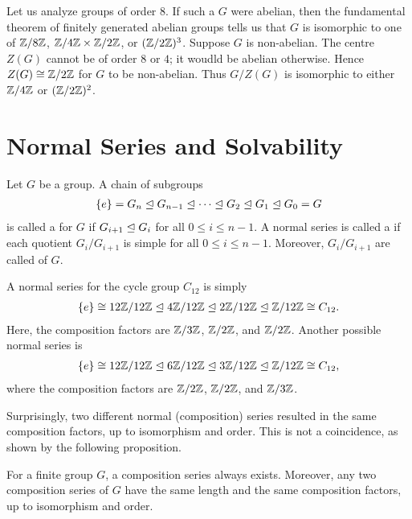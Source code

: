 \begin{example}
    Let us analyze groups of order $8$. If such a $G$ were abelian, then the fundamental theorem of finitely generated abelian groups tells us that $G$ is isomorphic to one of $\mathbb{Z}/8\mathbb{Z}$, $\mathbb{Z}/4\mathbb{Z} \times \mathbb{Z}/2\mathbb{Z}$, or $(\mathbb{Z}/2\mathbb{Z})^{3}$. Suppose $G$ is non-abelian. The centre $Z(G)$ cannot be of order $8$ or $4$; it woudld be abelian otherwise. Hence $Z(G) \cong \mathbb{Z}/2\mathbb{Z}$ for $G$ to be non-abelian. Thus $G/Z(G)$ is isomorphic to either $\mathbb{Z}/4\mathbb{Z}$ or $(\mathbb{Z}/2\mathbb{Z})^{2}$.
\end{example}

\section{Normal Series and Solvability}

\begin{definition}
    Let $G$ be a group. A chain of subgroups
    \begin{align}
        \{e\} = G_{n} \trianglelefteq G_{n-1} \trianglelefteq \cdots \trianglelefteq G_{2} \trianglelefteq G_{1} \trianglelefteq G_{0} = G
    \end{align}
    is called a  for $G$ if $G_{i+1} \trianglelefteq G_{i}$ for all $0 \leq i \leq n-1$. A normal series is called a  if each quotient $G_{i}/G_{i+1}$ is simple for all $0 \leq i \leq n-1$. Moreover, $G_{i}/G_{i+1}$ are called  of $G$.
\end{definition}

\begin{example}
    A normal series for the cycle group $C_{12}$ is simply
    \begin{align}
        \{e\} \cong 12\mathbb{Z}/12\mathbb{Z} \trianglelefteq 4\mathbb{Z}/12\mathbb{Z} \trianglelefteq 2\mathbb{Z}/12\mathbb{Z} \trianglelefteq \mathbb{Z}/12\mathbb{Z} \cong C_{12}.
    \end{align}
    Here, the composition factors are $\mathbb{Z}/3\mathbb{Z}$, $\mathbb{Z}/2\mathbb{Z}$, and $\mathbb{Z}/2\mathbb{Z}$. Another possible normal series is
    \begin{align}
        \{e\} \cong 12\mathbb{Z}/12\mathbb{Z} \trianglelefteq 6\mathbb{Z}/12\mathbb{Z} \trianglelefteq 3\mathbb{Z}/12\mathbb{Z} \trianglelefteq \mathbb{Z}/12\mathbb{Z} \cong C_{12},
    \end{align}
    where the composition factors are $\mathbb{Z}/2\mathbb{Z}$, $\mathbb{Z}/2\mathbb{Z}$, and $\mathbb{Z}/3\mathbb{Z}$.
\end{example}

Surprisingly, two different normal (composition) series resulted in the same composition factors, up to isomorphism and order. This is not a coincidence, as shown by the following proposition.

\begin{proposition}
    For a finite group $G$, a composition series always exists. Moreover, any two composition series of $G$ have the same length and the same composition factors, up to isomorphism and order.
\end{proposition}

